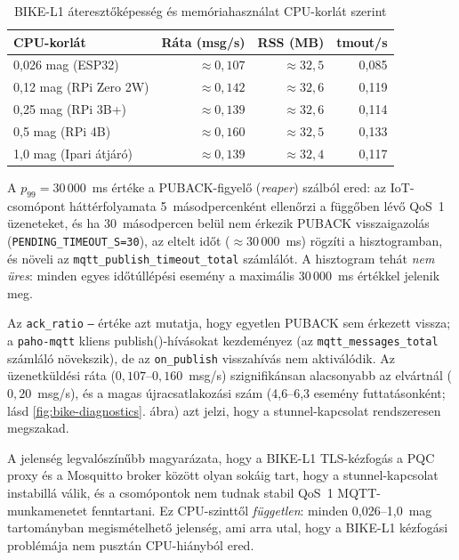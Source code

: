 \begin{table}[ht]
\centering
\caption{BIKE-L1 áteresztőképesség és memóriahasználat CPU-korlát szerint}
\label{tab:bikel1-throughput}
\begin{tabular}{lrrr}
\hline
\textbf{CPU-korlát} & \textbf{Ráta (msg/s)} & \textbf{RSS (MB)} & \textbf{tmout/s} \\
\hline
0,026 mag (ESP32)       & $\approx 0{,}107$ & $\approx 32{,}5$ & 0,085 \\
0,12 mag (RPi Zero 2W)  & $\approx 0{,}142$ & $\approx 32{,}6$ & 0,119 \\
0,25 mag (RPi 3B+)      & $\approx 0{,}139$ & $\approx 32{,}6$ & 0,114 \\
0,5 mag (RPi 4B)        & $\approx 0{,}160$ & $\approx 32{,}5$ & 0,133 \\
1,0 mag (Ipari átjáró)  & $\approx 0{,}139$ & $\approx 32{,}4$ & 0,117 \\
\hline
\end{tabular}
\end{table}

A $p_{99} = 30\,000$~ms értéke a PUBACK-figyelő (\emph{reaper}) szálból ered: az IoT-csomópont
háttérfolyamata 5~másodpercenként ellenőrzi a függőben lévő QoS~1 üzeneteket, és ha
30~másodpercen belül nem érkezik PUBACK visszaigazolás (\texttt{PENDING\_TIMEOUT\_S=30}),
az eltelt időt ($\approx 30\,000$~ms) rögzíti a hisztogramban, és növeli az
\texttt{mqtt\_publish\_timeout\_total} számlálót. A hisztogram tehát \emph{nem üres}:
minden egyes időtúllépési esemény a maximális 30\,000~ms értékkel jelenik meg.

Az \texttt{ack\_ratio} \texttt{---} értéke azt mutatja, hogy egyetlen PUBACK sem érkezett
vissza; a \texttt{paho-mqtt} kliens publish()-hívásokat kezdeményez (az \texttt{mqtt\_messages\_total}
számláló növekszik), de az \texttt{on\_publish} visszahívás nem aktiválódik. Az üzenetküldési
ráta ($0{,}107$--$0{,}160$~msg/s) szignifikánsan alacsonyabb az elvártnál ($0{,}20$~msg/s),
és a magas újracsatlakozási szám (4,6--6,3 esemény futtatásonként; lásd \ref{fig:bike-diagnostics}. ábra)
azt jelzi, hogy a stunnel-kapcsolat rendszeresen megszakad.

A jelenség legvalószínűbb magyarázata, hogy a BIKE-L1 TLS-kézfogás a PQC proxy és a Mosquitto
broker között olyan sokáig tart, hogy a stunnel-kapcsolat instabillá válik, és a csomópontok
nem tudnak stabil QoS~1 MQTT-munkamenetet fenntartani. Ez CPU-szinttől \emph{független}:
minden 0,026--1,0~mag tartományban megismételhető jelenség, ami arra utal, hogy a BIKE-L1
kézfogási problémája nem pusztán CPU-hiányból ered.

